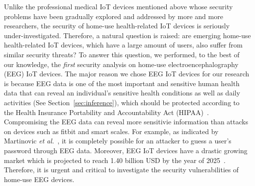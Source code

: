 \indent Unlike the professional medical IoT devices mentioned above whose security problems have been gradually explored and addressed by more and more researchers, the security of home-use health-related IoT devices is seriously under-investigated. Therefore, a natural question is raised: are emerging home-use health-related IoT devices, which have a large amount of users, also suffer from similar security threats? To answer this question, we performed, to the best of our knowledge, the \emph{first} security analysis on home-use electroencephalography (EEG) IoT devices. The major reason we chose EEG IoT devices for our research is because EEG data is one of the most important and sensitive human health data that can reveal an individual's sensitive health conditions as well as daily activities (See Section~\ref{sec:inference}), which should be protected according to the Health Insurance Portability and Accountability Act (HIPAA)~\cite{hipaa}. Compromising the EEG data can reveal more sensitivie information than attacks on devices such as fitbit and smart scales. For example, as indicated by Martinovic \emph{et al.}~\cite{martinovic2012feasibility}, it is completely possible for an attacker to guess a user's password through EEG data. Moreover, EEG IoT devices have a drastic growing market which is projected to reach 1.40 billion USD by the year of 2025~\cite{2025eegdevicemarket}. Therefore, it is urgent and critical to investigate the security vulnerabilities of home-use EEG devices.\\
%
